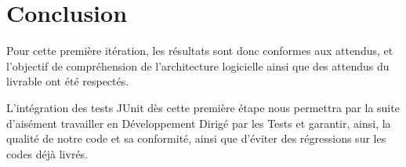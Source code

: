 \section*{Conclusion}

Pour cette première itération, les résultats sont donc conformes aux attendus, et l'objectif de compréhension de l'architecture logicielle ainsi que des attendus du livrable ont été respectés.

L'intégration des tests JUnit dès cette première étape nous permettra par la suite d'aisément travailler en Développement Dirigé par les Tests et garantir, ainsi, la qualité de notre code et sa conformité, ainsi que d'éviter des régressions sur les codes déjà livrés.